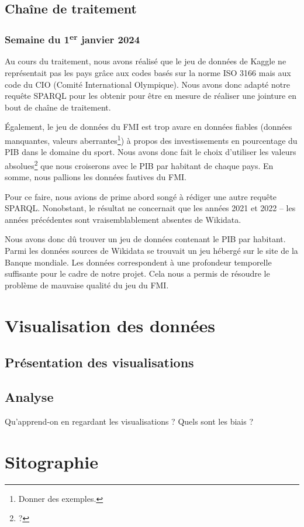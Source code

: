\documentclass[hidelinks, 12pt]{article}
\begin{document}
\subsection{Chaîne de traitement}
		
\subsubsection{Semaine du 1\textsuperscript{er} janvier 2024}

\label{CIO}Au cours du traitement, nous avons réalisé que le jeu de données de Kaggle ne représentait pas les pays grâce aux codes basés sur la norme ISO 3166 mais aux code du CIO (Comité International Olympique). Nous avons donc adapté notre requête SPARQL pour les obtenir pour être en mesure de réaliser une jointure en bout de chaîne de traitement.
		
Également, le jeu de données du FMI est trop avare en données fiables (données manquantes, valeurs aberrantes\footnote{Donner des exemples.}) à propos des investissements en pourcentage du PIB dans le domaine du sport. Nous avons donc fait le choix d'utiliser les valeurs absolues\footnote{?} que nous croiserons avec le PIB par habitant de chaque pays. En somme, nous pallions les données fautives du FMI.
		
Pour ce faire, nous avions de prime abord songé à rédiger une autre requête SPARQL. Nonobstant, le résultat ne concernait que les années 2021 et 2022 -- les années précédentes sont vraisemblablement absentes de Wikidata.
		
\label{banquemondiale}Nous avons donc dû trouver un jeu de données contenant le PIB par habitant. Parmi les données sources de Wikidata se trouvait un jeu hébergé sur le site de la Banque mondiale\autocite{worldbank}. Les données correspondent à une profondeur temporelle suffisante pour le cadre de notre projet. Cela nous a permis de résoudre le problème de mauvaise qualité du jeu du FMI.


\section{Visualisation des données}
	
\subsection{Présentation des visualisations}
		
\subsection{Analyse}
		
Qu'apprend-on en regardant les visualisations ? Quels sont les biais ?
\newpage

\section{Sitographie}
\printbibliography[heading=none]
\newpage

\tableofcontents
\end{document}
